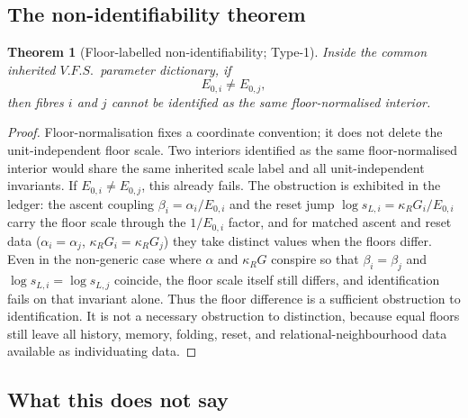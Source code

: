 \documentclass[11pt,a4paper]{article}
\def\mathrm#1{#1}%
\newcommand{\VFS}{\ensuremath{\mathrm{V.F.S.}}}
\theoremstyle{definition}
\theoremstyle{plain}
\newtheorem{theorem}[definition]{Theorem}
\theoremstyle{remark}
\begin{document}
\subsection{The non-identifiability theorem}

\begin{theorem}[Floor-labelled non-identifiability; Type-1]\label{thm:floor}
Inside the common inherited \VFS\ parameter dictionary, if
\[
E_{0,i}\neq E_{0,j},
\]
then fibres \(i\) and \(j\) cannot be identified as the same floor-normalised
interior.
\end{theorem}

\begin{proof}
Floor-normalisation fixes a coordinate convention; it does not delete the
unit-independent floor scale. Two interiors identified as the same
floor-normalised interior would share the same inherited scale label and all
unit-independent invariants. If \(E_{0,i}\neq E_{0,j}\), this already fails.
The obstruction is exhibited in the ledger: the ascent coupling
\(\beta_i=\alpha_i/E_{0,i}\) and the reset jump \(\log s_{L,i}=\kappa_R G_i/E_{0,i}\) carry
the floor scale through the \(1/E_{0,i}\) factor, and for matched ascent and reset data
(\(\alpha_i=\alpha_j\), \(\kappa_R G_i=\kappa_R G_j\)) they take distinct values when the
floors differ. Even in the non-generic case where \(\alpha\) and \(\kappa_R G\) conspire
so that \(\beta_i=\beta_j\) and \(\log s_{L,i}=\log s_{L,j}\) coincide, the floor scale
itself still differs, and identification fails on that invariant alone. Thus the floor
difference is a sufficient obstruction to identification. It is not a necessary
obstruction to distinction, because equal floors still leave all history, memory,
folding, reset, and relational-neighbourhood data available as individuating data.
\qedhere
\end{proof}

\subsection{What this does not say}
\end{document}
